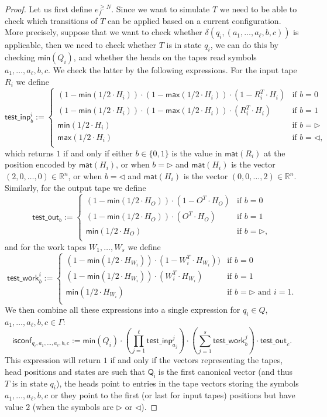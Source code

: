 \begin{proof}
Let us first define $e_f^{\geq N}$. Since we want to simulate $T$ we need to be able to check which 
transitions of $T$ can be applied based on a current configuration. More precisely,
suppose that we want to check whether $\delta(q_i,(a_1,\ldots,a_{\ell},b,c))$ is applicable, then we 
need to check whether $T$ is in state $q_i$, we can do this by checking 
$\mathsf{min}(Q_i)$, and whether the heads on the tapes read symbols $a_1,\ldots,a_{\ell},b,c$. We 
check the latter by the following expressions.
For the input tape $R_i$ we define
$$
\mathsf{test\_inp}^i_b:=\begin{cases}
(1-\mathsf{min}(1/2\cdot H_i))\cdot(1-\mathsf{max}(1/2\cdot H_i))\cdot(1- R_i^T\cdot H_i) & \text{if $b=0$}\\
(1-\mathsf{min}(1/2\cdot H_i))\cdot(1-\mathsf{max}(1/2\cdot H_i))\cdot(R_i^T\cdot H_i) & \text{if $b=1$}\\
\mathsf{min}(1/2\cdot H_i) & \text{if $b=\rhd$}\\
\mathsf{max}(1/2\cdot H_i) & \text{if $b=\lhd$},\\
\end{cases}
$$
which returns $1$ if and only if either $b\in\{0,1\}$ is the value in $\mathsf{mat}(R_i)$ at the 
position encoded by $\mathsf{mat}(H_i)$, or when $b=\rhd$ and $\mathsf{mat}(H_i)$ is the vector 
$(2,0,\ldots,0)\in\mathbb{R}^n$, or when $b=\lhd$ and $\mathsf{mat}(H_i)$ is the vector 
$(0,0,\ldots,2)\in\mathbb{R}^n$. Similarly, for the output tape we define
$$
\mathsf{test\_out}_b:=\begin{cases}
(1-\mathsf{min}(1/2\cdot H_O))\cdot(1- O^T\cdot H_O) & \text{if $b=0$}\\
(1-\mathsf{min}(1/2\cdot H_O))\cdot(O^T\cdot H_O) & \text{if $b=1$}\\
\mathsf{min}(1/2\cdot H_O) & \text{if $b=\rhd$},\\
\end{cases}
$$
and for the work tapes $W_1,\ldots,W_s$ we define
$$
\mathsf{test\_work}^i_b:=\begin{cases}
(1-\mathsf{min}(1/2\cdot H_{W_i}))\cdot(1- W_i^T\cdot H_{W_i})) & \text{if $b=0$}\\
(1-\mathsf{min}(1/2\cdot H_{W_i}))\cdot (W_i^T\cdot H_{W_i}) & \text{if $b=1$}\\
\mathsf{min}(1/2\cdot H_{W_i}) & \text{if $b=\rhd$ and $i=1$}.\\
\end{cases}
$$
We then combine all these expressions into a single expression for $q_i\in Q$, 
$a_1,\ldots,a_\ell,b,c\in\Gamma$:
$$
\mathsf{isconf}_{q_i,a_1,\ldots,a_\ell,b,c}:=
\mathsf{min}(Q_i)\cdot \left(\prod_{j=1}^{\ell} \mathsf{test\_inp}_{a_j}^j\right)
\cdot\left(\sum_{j=1}^s \mathsf{test\_work}_b^j\right)\cdot \mathsf{test\_out}_{c}.
$$
This expression will return $1$ if and only if the vectors representing the tapes, 
head positions and states are such that $\mathsf{Q_i}$ is the first canonical vector 
(and thus $T$ is in state $q_i$), the heads point to entries in the tape vectors storing 
the symbols $a_1,\ldots,a_{\ell}, b,c$ or they point to the first (or last for input tapes) 
positions but have value $2$ (when the symbols are $\rhd$ or $\lhd$). 


\end{proof}
